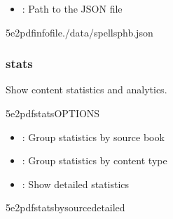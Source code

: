 \documentclass[letterpaper,10pt,english]{sphinxmanual}
\begin{document}
\sphinxAtStartPar
{}
\begin{itemize}
\item {} 
\sphinxAtStartPar
{}: Path to the JSON file

\end{itemize}

\sphinxAtStartPar
{}

\begin{sphinxVerbatim}[commandchars=\\\{\}]
5e2pdfinfofile./data/spells\PYGZhy{}phb.json
\end{sphinxVerbatim}


\subsubsection{stats}
\label{\detokenize{user-guide/cli-reference:stats}}
\sphinxAtStartPar
Show content statistics and analytics.

\begin{sphinxVerbatim}[commandchars=\\\{\}]
5e2pdfstats\PYG{o}{[}OPTIONS\PYG{o}{]}
\end{sphinxVerbatim}

\sphinxAtStartPar
{}
\begin{itemize}
\item {} 
\sphinxAtStartPar
{}: Group statistics by source book

\item {} 
\sphinxAtStartPar
{}: Group statistics by content type

\item {} 
\sphinxAtStartPar
{}: Show detailed statistics

\end{itemize}

\sphinxAtStartPar
{}

\begin{sphinxVerbatim}[commandchars=\\\{\}]
5e2pdfstats\PYGZhy{}\PYGZhy{}by\PYGZhy{}source\PYGZhy{}\PYGZhy{}detailed
\end{sphinxVerbatim}
\end{document}
